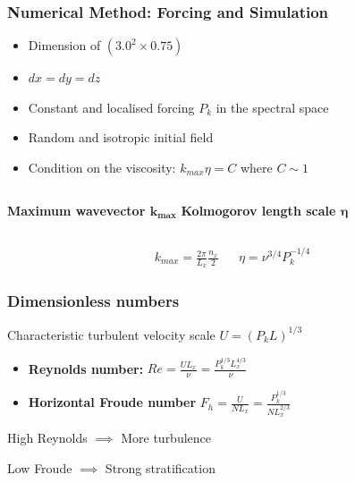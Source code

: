 \documentclass{beamer}
\begin{document}
\begin{frame}
\frametitle{Numerical Method: Forcing and Simulation}

\begin{itemize}
	\item Dimension of $(3.0^2 \times 0.75)$
	\item $dx = dy = dz$
	\item Constant and localised forcing $P_k$ in the spectral space
	\item Random and isotropic initial field
	\item Condition on the viscosity: $k_{max} \eta = C$ where $C \sim 1$
\end{itemize}

\vspace{0.5 cm}

\begin{columns}
\textbf{Maximum wavevector $\mathbf{k_{max}}$}
\textbf{Kolmogorov length scale $\boldsymbol{\eta}$}
\end{columns}
\begin{align*}
	k_{max} = \frac{2 \pi}{L_x} \frac{n_x}{2} && \eta = \nu^{3/4} P_k^{-1/4}
\end{align*}



\end{frame}


\begin{frame}
\frametitle{Dimensionless numbers}

Characteristic turbulent velocity scale $U = (P_k L)^{1/3}$

\begin{itemize}
\item \textbf{Reynolds number:} $Re = \frac{UL_x}{\nu} = \frac{P_k^{1/3} L_x^{4/3}}{\nu}$ 
\item \textbf{Horizontal Froude number} $F_h = \frac{U}{NL_x} = \frac{P_k^{1/3}}{N L_x^{2/3}}$
\end{itemize}

\quad

High Reynolds $\implies$ More turbulence

Low Froude $\implies$ Strong stratification

\end{frame}
\end{document}
